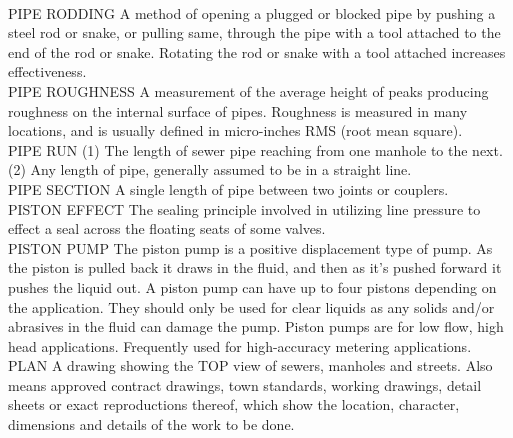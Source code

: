 \vspace{0.3cm}\\
PIPE RODDING
A method of opening a plugged or blocked pipe by pushing a steel rod or snake, or pulling same, through the pipe with a tool attached to the end of the rod or snake. Rotating the rod or snake with a tool attached increases effectiveness.
\vspace{0.3cm}\\
PIPE ROUGHNESS
A measurement of the average height of peaks producing roughness on the internal surface of pipes. Roughness is measured in many locations, and is usually defined in micro-inches RMS (root mean square).
\vspace{0.3cm}\\
PIPE RUN
(1) The length of sewer pipe reaching from one manhole to the next. (2) Any length of pipe, generally assumed to be in a straight line. 
\vspace{0.3cm}\\
PIPE SECTION
A single length of pipe between two joints or couplers. 
\vspace{0.3cm}\\
PISTON EFFECT
The sealing principle involved in utilizing line pressure to effect a seal across the floating seats of some valves.
\vspace{0.3cm}\\
PISTON PUMP
The piston pump is a positive displacement type of pump. As the piston is pulled back it draws in the fluid, and then as it’s pushed forward it pushes the liquid out. A piston pump can have up to four pistons depending on the application. They should only be used for clear liquids as any solids and/or abrasives in the fluid can damage the pump. Piston pumps are for low flow, high head applications. Frequently used for high-accuracy metering applications.
\vspace{0.3cm}\\
PLAN
A drawing showing the TOP view of sewers, manholes and streets. Also means approved contract drawings, town standards, working drawings, detail sheets or exact reproductions thereof, which show the location, character, dimensions and details of the work to be done. 
\vspace{0.3cm}\\


